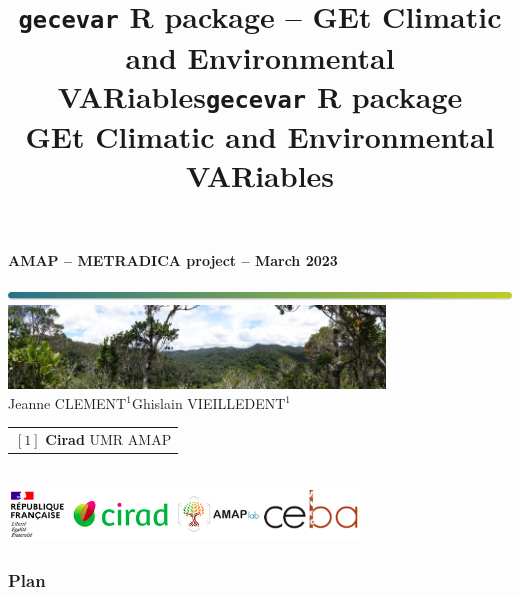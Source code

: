 \documentclass[10pt,table,dvipsnames,compress]{beamer}
\date{}
\title{\texttt{gecevar} R package -- GEt Climatic and Environmental VARiables}
\title[gecevar]{\texttt{gecevar} R package \\ GEt Climatic and Environmental VARiables}
\newif\ifplacelogo %
\begin{document}
{
  \begin{frame}
  
  \begin{center}
  \small{\textbf{AMAP -- METRADICA project -- March 2023}}
  \end{center}
  \vspace{-1cm}
  \titlepage %
  \vspace{-3.5cm}
  \begin{center}
    \includegraphics[width=\textwidth]{figs/Barre_couleur}\\
    \vspace{0.5cm}
    \includegraphics[width=10cm]{figs/Banniere}\\
    \vspace{0.3cm}
    \small{Jeanne CLEMENT$^{1}$\hspace{0.25cm}Ghislain VIEILLEDENT$^{1}$}\\
    \vspace{0.15cm}
    {\scriptsize
      \begin{tabular}{l}
        $[1]$ \textbf{Cirad} UMR AMAP
      \end{tabular}
    }\\
    \vspace{0.3cm}
    \includegraphics[width=0.70\textwidth]{figs/partners_logos}
    
  \end{center}
  \end{frame}
}


\placelogotrue
\begin{frame}
  \frametitle{Plan}
  \begin{columns}[c]
    \begin{column}{0.5\textwidth}
      \tableofcontents[sections=1]
      \vspace{0.5cm}
      \tableofcontents[sections=2]
    \end{column}
    \begin{column}{0.5\textwidth}
        \tableofcontents[sections=3]
        \vspace{0.5cm}
        \tableofcontents[sections=4]
    \end{column}
  \end{columns}
\end{frame}
\placelogofalse
\end{document}
